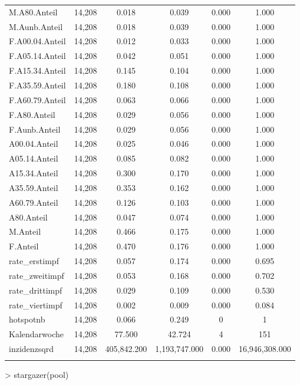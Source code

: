 \documentclass{article}
\begin{document}
\begin{table}[!htbp]
\begin{tabular}{@{\extracolsep{5pt}}lccccc}
M.A80.Anteil & 14,208 & 0.018 & 0.039 & 0.000 & 1.000 \\ 
M.Aunb.Anteil & 14,208 & 0.018 & 0.039 & 0.000 & 1.000 \\ 
F.A00.04.Anteil & 14,208 & 0.012 & 0.033 & 0.000 & 1.000 \\ 
F.A05.14.Anteil & 14,208 & 0.042 & 0.051 & 0.000 & 1.000 \\ 
F.A15.34.Anteil & 14,208 & 0.145 & 0.104 & 0.000 & 1.000 \\ 
F.A35.59.Anteil & 14,208 & 0.180 & 0.108 & 0.000 & 1.000 \\ 
F.A60.79.Anteil & 14,208 & 0.063 & 0.066 & 0.000 & 1.000 \\ 
F.A80.Anteil & 14,208 & 0.029 & 0.056 & 0.000 & 1.000 \\ 
F.Aunb.Anteil & 14,208 & 0.029 & 0.056 & 0.000 & 1.000 \\ 
A00.04.Anteil & 14,208 & 0.025 & 0.046 & 0.000 & 1.000 \\ 
A05.14.Anteil & 14,208 & 0.085 & 0.082 & 0.000 & 1.000 \\ 
A15.34.Anteil & 14,208 & 0.300 & 0.170 & 0.000 & 1.000 \\ 
A35.59.Anteil & 14,208 & 0.353 & 0.162 & 0.000 & 1.000 \\ 
A60.79.Anteil & 14,208 & 0.126 & 0.103 & 0.000 & 1.000 \\ 
A80.Anteil & 14,208 & 0.047 & 0.074 & 0.000 & 1.000 \\ 
M.Anteil & 14,208 & 0.466 & 0.175 & 0.000 & 1.000 \\ 
F.Anteil & 14,208 & 0.470 & 0.176 & 0.000 & 1.000 \\ 
rate\_erstimpf & 14,208 & 0.057 & 0.174 & 0.000 & 0.695 \\ 
rate\_zweitimpf & 14,208 & 0.053 & 0.168 & 0.000 & 0.702 \\ 
rate\_drittimpf & 14,208 & 0.029 & 0.109 & 0.000 & 0.530 \\ 
rate\_viertimpf & 14,208 & 0.002 & 0.009 & 0.000 & 0.084 \\ 
hotspotnb & 14,208 & 0.066 & 0.249 & 0 & 1 \\ 
Kalendarwoche & 14,208 & 77.500 & 42.724 & 4 & 151 \\ 
inzidenzsqrd & 14,208 & 405,842.200 & 1,193,747.000 & 0.000 & 16,946,308.000 \\ 
\hline \\[-1.8ex] 
\end{tabular} 
\end{table} 
> stargazer(pool)
\end{document}
